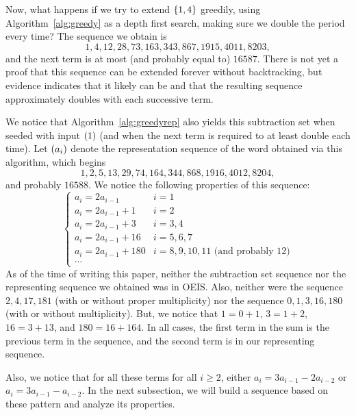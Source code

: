\documentclass[english,12pt]{article}
\newcommand{\seq}{\p}
\begin{document}
Now, what happens if we try to extend $\left\{1,4\right\}$ greedily, using Algorithm~\ref{alg:greedy} as a depth first search, making sure we double the period every time?  The sequence we obtain is
\[
1, 4, 12, 28, 73, 163, 343, 867, 1915, 4011, 8203,
\]
and the next term is at most (and probably equal to) $16587$.  There is not yet a proof that this sequence can be extended forever without backtracking, but evidence indicates that it likely can be and that the resulting sequence approximately doubles with each successive term.

We notice that Algorithm~\ref{alg:greedyrep} also yields this subtraction set when seeded with input $\seq{1}$ (and when the next term is required to at least double each time).  Let $\seq{a_i}$ denote the representation sequence of the word obtained via this algorithm, which begins
\[
1, 2, 5, 13, 29, 74, 164, 344, 868, 1916, 4012, 8204,
\]
and probably $16588$.  We notice the following properties of this sequence:
\[
\begin{cases}
a_i=2a_{i-1} & i=1\\
a_i=2a_{i-1}+1 & i=2\\
a_i=2a_{i-1}+3 & i=3,4\\
a_i=2a_{i-1}+16 & i=5,6,7\\
a_i=2a_{i-1}+180 & i=8,9,10,11\text{ (and probably $12$)}\\
\cdots
\end{cases}
\]
As of the time of writing this paper, neither the subtraction set sequence nor the representing sequence we obtained was in OEIS.  Also, neither were the sequence $2,4,17,181$ (with or without proper multiplicity) nor the sequence $0,1,3,16,180$ (with or without multiplicity).  But, we notice that $1=0+1$, $3=1+2$, $16=3+13$, and $180=16+164$.  In all cases, the first term in the sum is the previous term in the sequence, and the second term is in our representing sequence.

Also, we notice that for all these terms for all $i\geq2$, either $a_i=3a_{i-1}-2a_{i-2}$ or $a_i=3a_{i-1}-a_{i-2}$.
In the next subsection, we will build a sequence based on these pattern and analyze its properties.
\end{document}
